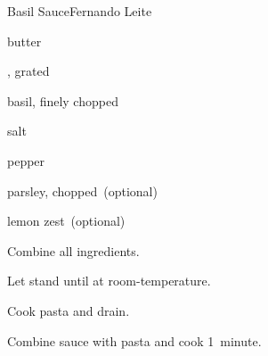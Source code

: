 \begin{recipe}{Basil Sauce}{Fernando Leite}{}

\begin{ingredients}
\item \lbs{\quarter} butter
\item \C{\half} , grated
\item {} 
\item basil, finely chopped
\item salt
\item pepper
\item parsley, chopped~(optional)
\item lemon zest~(optional)
\end{ingredients}

\begin{directions}
\item Combine all ingredients.
\item Let stand until at room-temperature.
\item Cook pasta and drain.
\item Combine sauce with pasta and cook 1~minute.
\end{directions}

\end{recipe}
